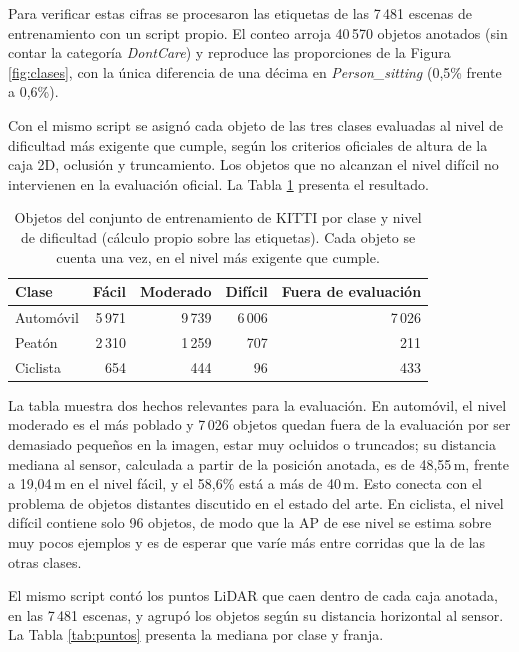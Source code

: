 \documentclass[11pt,letterpaper]{article}
\begin{document}
Para verificar estas cifras se procesaron las etiquetas de las 7\,481 escenas de entrenamiento con un script propio. El conteo arroja 40\,570 objetos anotados (sin contar la categoría \textit{DontCare}) y reproduce las proporciones de la Figura \ref{fig:clases}, con la única diferencia de una décima en \textit{Person\_sitting} (0,5\% frente a 0,6\%).

Con el mismo script se asignó cada objeto de las tres clases evaluadas al nivel de dificultad más exigente que cumple, según los criterios oficiales de altura de la caja 2D, oclusión y truncamiento. Los objetos que no alcanzan el nivel difícil no intervienen en la evaluación oficial. La Tabla \ref{tab:dificultad} presenta el resultado.

\begin{table}[htbp]
\caption{Objetos del conjunto de entrenamiento de KITTI por clase y nivel de dificultad (cálculo propio sobre las etiquetas). Cada objeto se cuenta una vez, en el nivel más exigente que cumple.}
\label{tab:dificultad}
\centering
\small
\begin{tabular}{@{}lrrrr@{}}
\toprule
\textbf{Clase} & \textbf{Fácil} & \textbf{Moderado} & \textbf{Difícil} & \textbf{Fuera de evaluación} \\
\midrule
Automóvil & 5\,971 & 9\,739 & 6\,006 & 7\,026 \\
Peatón    & 2\,310 & 1\,259 &    707 &    211 \\
Ciclista  &    654 &    444 &     96 &    433 \\
\bottomrule
\end{tabular}
\end{table}

La tabla muestra dos hechos relevantes para la evaluación. En automóvil, el nivel moderado es el más poblado y 7\,026 objetos quedan fuera de la evaluación por ser demasiado pequeños en la imagen, estar muy ocluidos o truncados; su distancia mediana al sensor, calculada a partir de la posición anotada, es de 48,55\,m, frente a 19,04\,m en el nivel fácil, y el 58,6\% está a más de 40\,m. Esto conecta con el problema de objetos distantes discutido en el estado del arte. En ciclista, el nivel difícil contiene solo 96 objetos, de modo que la AP de ese nivel se estima sobre muy pocos ejemplos y es de esperar que varíe más entre corridas que la de las otras clases.

El mismo script contó los puntos LiDAR que caen dentro de cada caja anotada, en las 7\,481 escenas, y agrupó los objetos según su distancia horizontal al sensor. La Tabla \ref{tab:puntos} presenta la mediana por clase y franja.
\end{document}
